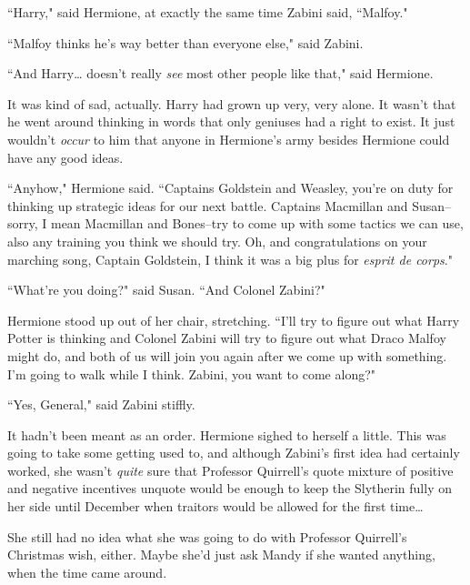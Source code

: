 ``Harry," said Hermione, at exactly the same time Zabini said, ``Malfoy."

``Malfoy thinks he's way better than everyone else," said Zabini.

``And Harry{\ldots} doesn't really \emph{see} most other people like that," said Hermione.

It was kind of sad, actually. Harry had grown up very, very alone. It wasn't that he went around thinking in words that only geniuses had a right to exist. It just wouldn't \emph{occur} to him that anyone in Hermione's army besides Hermione could have any good ideas.

``Anyhow," Hermione said. ``Captains Goldstein and Weasley, you're on duty for thinking up strategic ideas for our next battle. Captains Macmillan and Susan\---sorry, I mean Macmillan and Bones\---try to come up with some tactics we can use, also any training you think we should try. Oh, and congratulations on your marching song, Captain Goldstein, I think it was a big plus for \emph{esprit de corps}."

``What're you doing?" said Susan. ``And Colonel Zabini?"

Hermione stood up out of her chair, stretching. ``I'll try to figure out what Harry Potter is thinking and Colonel Zabini will try to figure out what Draco Malfoy might do, and both of us will join you again after we come up with something. I'm going to walk while I think. Zabini, you want to come along?"

``Yes, General," said Zabini stiffly.

It hadn't been meant as an order. Hermione sighed to herself a little. This was going to take some getting used to, and although Zabini's first idea had certainly worked, she wasn't \emph{quite} sure that Professor Quirrell's quote mixture of positive and negative incentives unquote would be enough to keep the Slytherin fully on her side until December when traitors would be allowed for the first time{\ldots}

She still had no idea what she was going to do with Professor Quirrell's Christmas wish, either. Maybe she'd just ask Mandy if she wanted anything, when the time came around.

